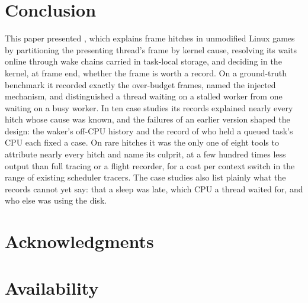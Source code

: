 \section{Conclusion}

This paper presented \sys, which explains frame hitches in unmodified Linux
games by partitioning the presenting thread's frame by kernel cause,
resolving its waits online through wake chains carried in task-local
storage, and deciding in the kernel, at frame end, whether the frame is
worth a record. On a ground-truth benchmark it recorded exactly the
over-budget frames, named the injected mechanism, and distinguished a
thread waiting on a stalled worker from one waiting on a busy worker. In ten
case studies its records explained nearly every hitch whose cause was known,
and the failures of an earlier version shaped the design: the waker's
off-CPU history and the record of who held a queued task's CPU each fixed a
case. On rare hitches it was the only one of eight tools to attribute nearly
every hitch and name its culprit, at a few hundred times less output than
full tracing or a flight recorder, for a cost per context switch in the range of existing
scheduler tracers. The case studies also list plainly what the records
cannot yet say: that a sleep was late, which CPU a thread waited for, and
who else was using the disk.

\section*{Acknowledgments}


\section*{Availability}


